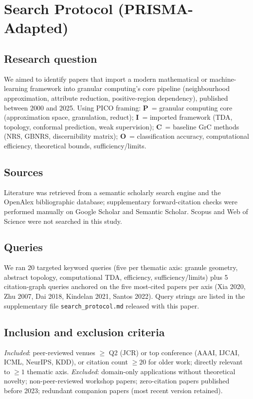 \appendix
\section{Search Protocol (PRISMA-Adapted)}
\label{app:search}

\subsection*{Research question}
We aimed to identify papers that import a modern mathematical or machine-learning
framework into granular computing's core pipeline (neighbourhood approximation,
attribute reduction, positive-region dependency), published between 2000 and 2025.
Using PICO framing: \textbf{P}~= granular computing core (approximation space,
granulation, reduct); \textbf{I}~= imported framework (TDA, topology, conformal
prediction, weak supervision); \textbf{C}~= baseline GrC methods (NRS, GBNRS,
discernibility matrix); \textbf{O}~= classification accuracy, computational
efficiency, theoretical bounds, sufficiency/limits.

\subsection*{Sources}
Literature was retrieved from a semantic scholarly search engine and the OpenAlex
bibliographic database; supplementary forward-citation checks were performed
manually on Google Scholar and Semantic Scholar.  Scopus and Web of Science were
not searched in this study.

\subsection*{Queries}
We ran 20 targeted keyword queries (five per thematic axis: granule
geometry, abstract topology, computational TDA, efficiency, sufficiency/limits)
plus 5 citation-graph queries anchored on the five most-cited papers per
axis (Xia 2020, Zhu 2007, Dai 2018, Kindelan 2021, Santos 2022).  Query strings
are listed in the supplementary file \texttt{search\_protocol.md} released with
this paper.

\subsection*{Inclusion and exclusion criteria}
\textit{Included}: peer-reviewed venues $\geq$ Q2 (JCR) or top conference
(AAAI, IJCAI, ICML, NeurIPS, KDD), or citation count $\geq 20$ for older work;
directly relevant to $\geq 1$ thematic axis.  \textit{Excluded}: domain-only
applications without theoretical novelty; non-peer-reviewed workshop papers;
zero-citation papers published before 2023; redundant companion papers (most
recent version retained).

